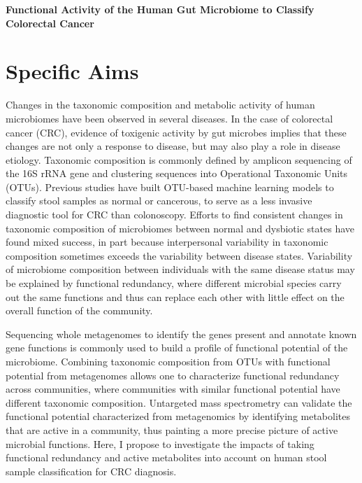 \documentclass[12pt]{article}
\begin{document}
\sloppy
\begin{center}\large{\textbf{Functional Activity of the Human Gut Microbiome to Classify Colorectal Cancer}}\end{center}
\section*{Specific Aims}

Changes in the taxonomic composition and metabolic activity of human microbiomes have been observed in several diseases.
In the case of colorectal cancer (CRC), evidence of toxigenic activity by gut microbes implies that these changes are not only a response to disease, but may also play a role in disease etiology.
Taxonomic composition is commonly defined by amplicon sequencing of the 16S rRNA gene and clustering sequences into Operational Taxonomic Units (OTUs).
Previous studies have built OTU-based machine learning models to classify stool samples as normal or cancerous, to serve as a less invasive diagnostic tool for CRC than colonoscopy.
Efforts to find consistent changes in taxonomic composition of microbiomes between normal and dysbiotic states have found mixed success, in part because interpersonal variability in taxonomic composition sometimes exceeds the variability between disease states.
Variability of microbiome composition between individuals with the same disease status may be explained by functional redundancy, where different microbial species carry out the same functions and thus can replace each other with little effect on the overall function of the community.

Sequencing whole metagenomes to identify the genes present and annotate known gene functions is commonly used to build a profile of functional potential of the microbiome.
Combining taxonomic composition from OTUs with functional potential from metagenomes allows one to characterize functional redundancy across communities, where communities with similar functional potential have different taxonomic composition.
Untargeted mass spectrometry can validate the functional potential characterized from metagenomics by identifying metabolites that are active in a community, thus painting a more precise picture of active microbial functions.
Here, I propose to investigate the impacts of taking functional redundancy and active metabolites into account on human stool sample classification for CRC diagnosis.
\end{document}
